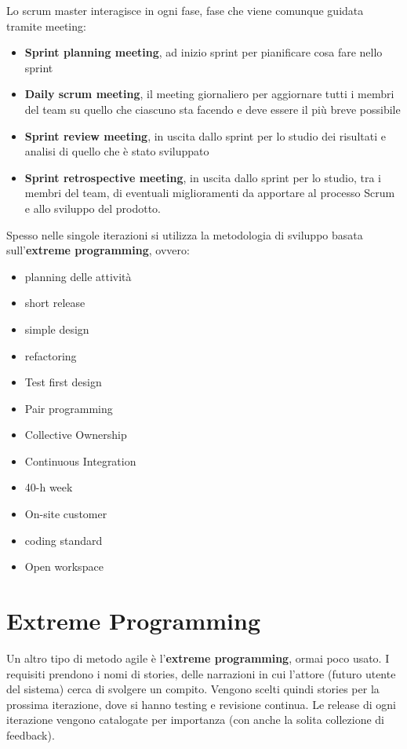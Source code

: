 Lo scrum master interagisce in ogni fase, fase che viene comunque guidata tramite
meeting:
\begin{itemize}
      \item \textbf{Sprint planning meeting}, ad inizio sprint per pianificare 
            cosa fare nello sprint
      \item \textbf{Daily scrum meeting}, il meeting giornaliero per aggiornare
            tutti i membri del team su quello che ciascuno sta facendo e deve essere
            il più breve possibile
      \item \textbf{Sprint review meeting}, in uscita dallo sprint per lo studio dei
            risultati e analisi di quello che è stato sviluppato
      \item \textbf{Sprint retrospective meeting}, in uscita dallo sprint per lo
            studio, tra i membri del team, di eventuali miglioramenti da apportare 
            al processo Scrum e allo sviluppo del prodotto.
\end{itemize}

Spesso nelle singole iterazioni si utilizza la metodologia di sviluppo basata
sull'\textbf{extreme programming}, ovvero:
\begin{itemize}
	\item planning delle attività
	\item short release
	\item simple design
	\item refactoring
	\item Test first design
	\item Pair programming
	\item Collective Ownership
	\item Continuous Integration
	\item 40-h week
	\item On-site customer
	\item coding standard
	\item Open workspace
\end{itemize}

\section{Extreme Programming}
Un altro tipo di metodo agile è l'\textbf{extreme programming}, ormai poco usato.
I requisiti prendono i nomi di stories, delle narrazioni in cui l’attore
(futuro utente del sistema) cerca di svolgere un compito. Vengono scelti quindi stories
per la prossima iterazione, dove si hanno testing e revisione continua. Le release
di ogni iterazione vengono catalogate per importanza (con anche la solita 
collezione di feedback).